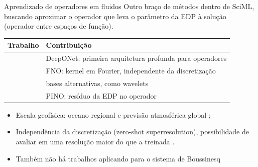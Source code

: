\begin{frame}{Aprendizado de operadores em fluidos}
  Outro braço de métodos dentro de SciML, buscando aproximar o operador que leva o
  parâmetro da EDP à solução (operador entre espaços de função).
  \vspace{4pt}
  \begin{center}
    \small
    \begin{tabular}{@{}ll@{}}
      \toprule
      \textbf{Trabalho} & \textbf{Contribuição} \\
      \midrule
      \textcite{lu2021deeponet} & DeepONet: primeira arquitetura profunda para operadores \\
      \textcite{li2021}         & FNO: kernel em Fourier, independente da discretização \\
      \textcite{gupta2021}      & bases alternativas, como wavelets \\
      \textcite{li2023pino}     & PINO: resíduo da EDP no operador \\
      \bottomrule
    \end{tabular}
  \end{center}
  \vspace{2pt}
  \begin{itemize}[<+->]
    \item Escala geofísica: oceano regional e previsão atmosférica global
          \parencite{bonev2023, uchida2025, yu2025};
    \item Independência da discretização (zero-shot superresolution), possibilidade de avaliar em uma resolução maior do que a treinada \parencite{li2021, li2023pino}.
    \item \textcolor{AmurmapleRed}{Também não há trabalhos aplicando para o sistema de Boussinesq}
  \end{itemize}
\end{frame}

